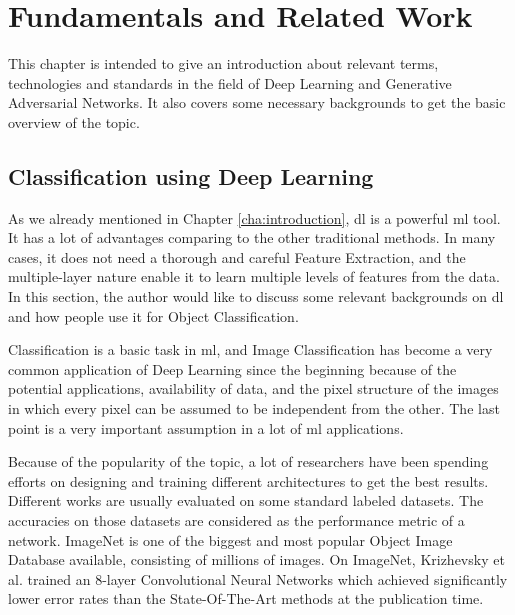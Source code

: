 \chapter{Fundamentals and Related Work\label{cha:relatedwork}}

This chapter is intended to give an introduction about relevant terms, technologies and
standards in the field of Deep Learning and Generative Adversarial Networks. It also
covers some necessary backgrounds to get the basic overview of the topic.

\section{Classification using Deep Learning}
As we already mentioned in Chapter \ref{cha:introduction}, \acrfull{dl} is a powerful
\acrshort{ml} tool. It has a lot of advantages comparing to the other traditional methods.
In many cases, it does not need a thorough and careful Feature Extraction, and the
multiple-layer nature enable it to learn multiple levels of features from the data. In
this section, the author would like to discuss some relevant backgrounds on \acrshort{dl}
and how people use it for Object Classification.

Classification is a basic task in \acrshort{ml}, and Image Classification has become a
very common application of Deep Learning since the beginning because of the potential
applications, availability of data, and the pixel structure of the images in which every
pixel can be assumed to be independent from the other. The last point is a very important
assumption in a lot of \acrshort{ml} applications. 

Because of the popularity of the topic, a lot of researchers have been spending efforts on
designing and training different architectures to get the best results.  Different works
are usually evaluated on some standard labeled datasets. The accuracies on those datasets
are considered as the performance metric of a network. ImageNet  is
one of the biggest and most popular Object Image Database available, consisting of
millions of images. On ImageNet, Krizhevsky et al.  trained an 8-layer
Convolutional Neural Networks which achieved significantly lower error rates than the
State-Of-The-Art methods at the publication time.

